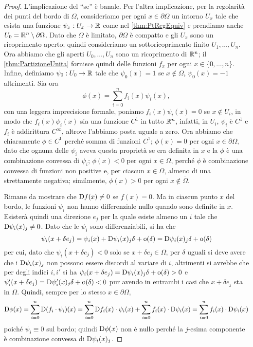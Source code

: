 \begin{proof}
	L'implicazione del ``se'' è banale. Per l'altra implicazione, per la regolarità dei punti del bordo di $\Omega$, consideriamo per ogni
	$x\in\partial \Omega$ un intorno $U_x$ tale che esista una funzione $\psi_x:U_x\rightarrow \mathbb R$ come nel \cref{thm:PtRegEquiv} e prendiamo
	anche $U_0 = \mathbb R^n \setminus \partial \Omega$. Dato che $\Omega$ è limitato, $\partial\Omega$ è compatto e gli $U_x$ sono un ricoprimento
	aperto; quindi consideriamo un sottoricoprimento finito $U_1, \dots, U_n$. Ora abbiamo che gli aperti $U_0,\dots,U_n$ sono un ricoprimento
	di $\mathbb R^n$; il \cref{thm:PartizioneUnita} fornisce quindi delle funzioni $f_x$ per ogni $x\in\{0,\dots, n\}$.
	Infine, definiamo $\psi_0:U_0\rightarrow \mathbb R$ tale che $\psi_0(x)=1$ se $x\notin \Omega$, $\psi_0(x)=-1$ altrimenti. Sia ora 
	\[
		\phi(x)=\sum_{i=0}^n f_i(x) \psi_i(x),
	\]
	con una leggera imprecisione formale, poniamo $f_i(x) \psi_i(x) = 0$ se $x\notin U_i$, in modo che $f_i(x) \psi_i(x)$ sia una funzione
	$C^1$ in tutto $\mathbb R^n$, infatti, in $U_i$, $\psi_i$ è $C^1$ e $f_i$ è addirittura $C^{\infty}$, altrove l'abbiamo posta uguale a zero.
	Ora abbiamo che chiaramente $\phi\in C^1$ perché somma di funzioni $C^1$; $\phi(x)=0$ per ogni $x\in \partial\Omega$, dato che ognuna delle
	$\psi_i$ aveva questa proprietà se era definita in $x$ e la $\phi$ è una combinazione convessa di $\psi_i$;
	$\phi(x)<0$ per ogni $x \in \Omega$, perché $\phi$ è combinazione convessa di funzioni non positive e, per ciascun $x \in \Omega$,
	almeno di una strettamente negativa; similmente, $\phi(x)>0$ per ogni $x \notin \bar{\Omega}$.
	
	Rimane da mostrare che $\mathrm D f(x)\neq 0$ se $f(x)=0$. Ma in ciascun punto $x$ del bordo, le funzioni $\psi_i$ non hanno differenziale nullo quando
	sono definite in $x$. Esisterà quindi una direzione $e_j$ per la quale esiste almeno un $i$ tale che $\mathrm D \psi_i(x)_j\neq 0$. Dato che le $\psi_i$
	sono differenziabili, si ha che
	\[
		\psi_i(x+\delta e_j)=\psi_i(x)+\mathrm D \psi_i(x)_j \delta + \mathrm{o}(\delta) = \mathrm D \psi_i(x)_j \delta + \mathrm{o}(\delta)
	\]
	per cui, dato che $\psi_i(x+\delta e_j)<0$ solo se $x+\delta e_j\in \Omega$, per $\delta$ uguali si deve avere che i $\mathrm D \psi_i(x)_j$ non possono
	essere discordi al variare di $i$, altrimenti si avrebbe che per degli indici $i,i'$ si ha $\psi_i(x+\delta e_j)=
	\mathrm D \psi_i(x)_j \delta + \mathrm{o}(\delta)>0$ e $\psi_i'(x+\delta e_j)=\mathrm D \psi_i'(x)_j \delta + \mathrm{o}(\delta)<0$ pur avendo in entrambi i casi
	che $x+\delta e_j$ sta in $\Omega$. Quindi, sempre per lo stesso $x\in\partial \Omega$,
	\[ 
		\mathrm D \phi(x)=\sum_{i=0}^n \mathrm D (f_i \cdot\psi_i)(x)=\sum_{i=0}^n \mathrm D f_i(x)\cdot \psi_i(x)+\sum_{i=0}^n f_i(x)\cdot \mathrm D  \psi_i(x)=
		\sum_{i=0}^n f_i(x)\cdot \mathrm D  \psi_i(x)
	\]
	poiché $\psi_i\equiv 0$ sul bordo; quindi $\mathrm D \phi(x)$ non è nullo perché la $j$-esima componente è combinazione convessa di $\mathrm D \psi_i(x)_j$.
\end{proof}

